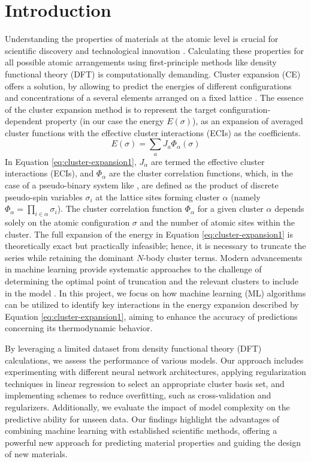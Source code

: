 \documentclass{article}
\let\citep\parencite   %
\begin{document}
\section{Introduction}
Understanding the properties of materials at the atomic level is crucial for scientific discovery and technological innovation \citep{national1999condensed}. Calculating these properties for all possible atomic arrangements using first-principle methods like density functional theory (DFT) \citep{DFT1} is computationally demanding.
Cluster expansion (CE) offers a solution, by allowing to predict the energies of different configurations and concentrations of a several elements arranged on a fixed lattice \citep{morgan2017using}. The essence of the cluster expansion method is to represent the target configuration-dependent property (in our case the energy \(E(\sigma)\)), as an expansion of averaged cluster functions with the effective cluster interactions (ECIs) as the coefficients.
\begin{equation}
E(\sigma) = \sum_{a} J_a \Phi_\alpha(\sigma)
\label{eq:cluster-expansion1}
\end{equation}
In Equation \ref{eq:cluster-expansion1}, \(J_{\alpha}\) are termed 
the effective cluster interactions
(ECIs), and \(\Phi_{\alpha}\) are the cluster correlation functions, which, in the case of a pseudo-binary system like , are defined as the product of discrete pseudo-spin variables \(\sigma_i\) at the lattice sites forming cluster \(\alpha\) (namely $\Phi_{\alpha} = \prod_{i \in \alpha} \sigma_i$). The cluster correlation function \(\Phi_{\alpha}\) for a given cluster \(\alpha\) depends solely on the atomic configuration $\sigma$ and the number of atomic sites within the cluster.   
The full expansion of the energy in Equation \ref{eq:cluster-expansion1} is theoretically exact but practically infeasible; hence, it is necessary to truncate the series while retaining the dominant \(N\)-body cluster terms. Modern advancements in machine learning provide systematic approaches to the challenge of determining the optimal point of truncation and the relevant clusters to include in the model \citep{natarajan2018machine}. 
In this project, we focus on how machine learning (ML) algorithms can be utilized to identify key interactions in the energy expansion described by Equation \ref{eq:cluster-expansion1}, aiming to enhance the accuracy of predictions concerning its thermodynamic behavior. \par By leveraging a limited dataset from density functional theory (DFT) calculations, we assess the performance of various models. Our approach includes experimenting with different neural network architectures, applying regularization techniques in linear regression to select an appropriate cluster basis set, and implementing schemes to reduce overfitting, such as cross-validation and regularizers. Additionally, we evaluate the impact of model complexity on the predictive ability for unseen data. Our findings highlight the advantages of combining machine learning with established scientific methods, offering a powerful new approach for predicting material properties and guiding the design of new materials.
\end{document}
